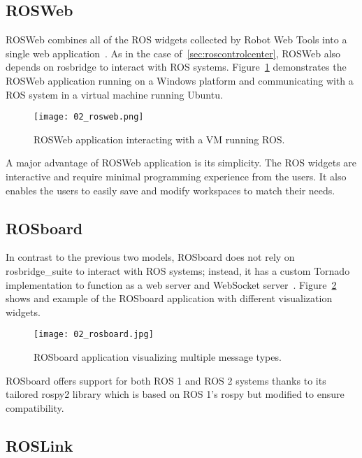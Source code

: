     \subsection{ROSWeb}

        ROSWeb combines all of the \ac{ROS} widgets collected by Robot Web Tools into a single web application~\cite{rosweb}. As in the case of~\ref{sec:roscontrolcenter}, ROSWeb also depends on \textsf{rosbridge} to interact with \ac{ROS} systems. Figure~\ref{fig:rosweb} demonstrates the ROSWeb application running on a Windows platform and communicating with a \ac{ROS} system in a virtual machine running Ubuntu.

        \begin{figure}[htbp]
            \centering
            \texttt{[image: 02\_rosweb.png]}
            \caption{ROSWeb application interacting with a \ac{VM} running \ac{ROS}.}
            \label{fig:rosweb}
        \end{figure}

        A major advantage of ROSWeb application is its simplicity. The \ac{ROS} widgets are interactive and require minimal programming experience from the users. It also enables the users to easily save and modify workspaces to match their needs.

    \subsection{ROSboard}

        In contrast to the previous two models, ROSboard does not rely on \textsf{rosbridge\_suite} to interact with \ac{ROS} systems; instead, it has a custom \textsf{Tornado} implementation to function as a web server and WebSocket server~\cite{rosboard}. Figure~\ref{fig:rosboard} shows and example of the ROSboard application with different visualization widgets.

        \begin{figure}[htbp]
            \centering
            \texttt{[image: 02\_rosboard.jpg]}
            \caption{ROSboard application visualizing multiple message types.}
            \label{fig:rosboard}
        \end{figure}

        ROSboard offers support for both \ac{ROS} 1 and \ac{ROS} 2 systems thanks to its tailored \textsf{rospy2} library which is based on \ac{ROS} 1's \textsf{rospy} but modified to ensure compatibility.

    \subsection{ROSLink}

